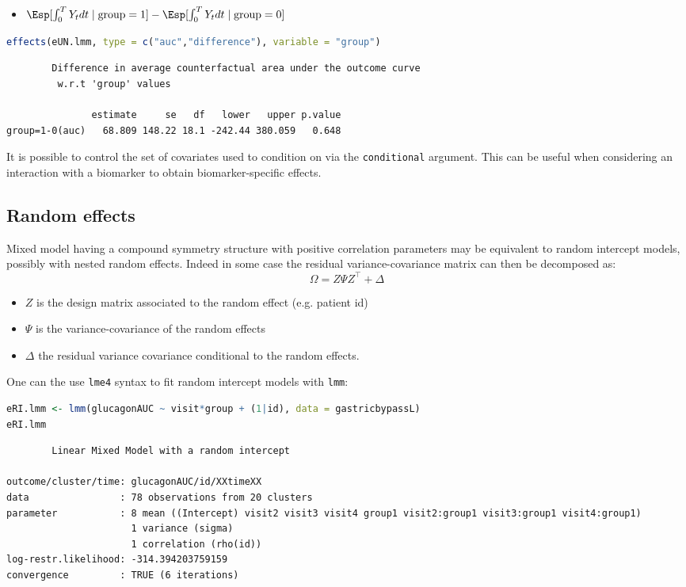 \documentclass[12pt]{article}
\newcommand\trans[1]{{#1}^\intercal}%
\begin{document}
\begin{itemize}
\item \(\Esp[\int_0^T Y_t dt \mid \text{group}=1]-\Esp[\int_0^T Y_t dt \mid \text{group}=0]\)
\end{itemize}
\begin{lstlisting}[language=r,numbers=none]
effects(eUN.lmm, type = c("auc","difference"), variable = "group")
\end{lstlisting}

\label{}
\begin{verbatim}
		Difference in average counterfactual area under the outcome curve
		 w.r.t 'group' values 

               estimate     se   df   lower   upper p.value  
group=1-0(auc)   68.809 148.22 18.1 -242.44 380.059   0.648
\end{verbatim}


It is possible to control the set of covariates used to condition on
via the \texttt{conditional} argument. This can be useful when considering an
interaction with a biomarker to obtain biomarker-specific effects.

\clearpage
\subsection{Random effects}
\label{sec:org7bd1596}

Mixed model having a compound symmetry structure with positive
correlation parameters may be equivalent to random intercept models,
possibly with nested random effects. Indeed in some case the residual
variance-covariance matrix can then be decomposed as:
\[ \Omega = Z \Psi \trans{Z} + \Delta \]
\begin{itemize}
\item \(Z\) is the design matrix associated to the random effect (e.g. patient id)
\item \(\Psi\) is the variance-covariance of the random effects
\item \(\Delta\) the residual variance covariance conditional to the random effects.
\end{itemize}
One can the use \texttt{lme4} syntax to fit random intercept models with
\texttt{lmm}:
\begin{lstlisting}[language=r,numbers=none]
eRI.lmm <- lmm(glucagonAUC ~ visit*group + (1|id), data = gastricbypassL)
eRI.lmm
\end{lstlisting}

\label{}
\begin{verbatim}
		Linear Mixed Model with a random intercept 

outcome/cluster/time: glucagonAUC/id/XXtimeXX 
data                : 78 observations from 20 clusters 
parameter           : 8 mean ((Intercept) visit2 visit3 visit4 group1 visit2:group1 visit3:group1 visit4:group1) 
                      1 variance (sigma) 
                      1 correlation (rho(id)) 
log-restr.likelihood: -314.394203759159 
convergence         : TRUE (6 iterations)
\end{verbatim}
\end{document}
